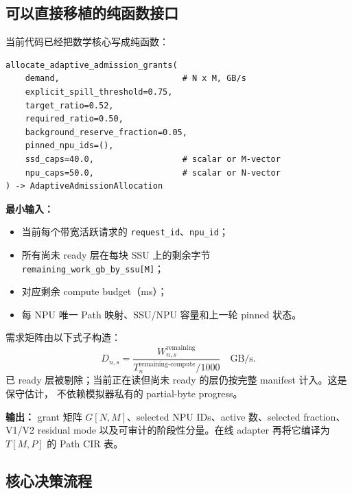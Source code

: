 \documentclass[UTF8,fontset=none,10pt,a4paper]{ctexart}
\newcommand{\code}[1]{\texttt{\small #1}}
\begin{document}
\subsection{可以直接移植的纯函数接口}

当前代码已经把数学核心写成纯函数：

\begin{lstlisting}[style=modernpython]
allocate_adaptive_admission_grants(
    demand,                         # N x M, GB/s
    explicit_spill_threshold=0.75,
    target_ratio=0.52,
    required_ratio=0.50,
    background_reserve_fraction=0.05,
    pinned_npu_ids=(),
    ssd_caps=40.0,                  # scalar or M-vector
    npu_caps=50.0,                  # scalar or N-vector
) -> AdaptiveAdmissionAllocation
\end{lstlisting}

\textbf{最小输入：}

\begin{itemize}
  \item 当前每个带宽活跃请求的 \code{request\_id}、\code{npu\_id}；
  \item 所有尚未 ready 层在每块 SSU 上的剩余字节
        \code{remaining\_work\_gb\_by\_ssu[M]}；
  \item 对应剩余 compute budget（ms）；
  \item 每 NPU 唯一 Path 映射、SSU/NPU 容量和上一轮 pinned 状态。
\end{itemize}

需求矩阵由以下式子构造：
\begin{equation}
  D_{n,s}=\frac{W^{\text{remaining}}_{n,s}}
  {T^{\text{remaining-compute}}_n/1000}\quad\text{GB/s}.
\end{equation}
已 ready 层被剔除；当前正在读但尚未 ready 的层仍按完整 manifest 计入。这是保守估计，
不依赖模拟器私有的 partial-byte progress。

\textbf{输出：} grant 矩阵 $G[N,M]$、selected NPU IDs、active 数、selected fraction、
V1/V2 residual mode 以及可审计的阶段性分量。在线 adapter 再将它编译为
$T[M,P]$ 的 Path CIR 表。

\subsection{核心决策流程}
\end{document}
